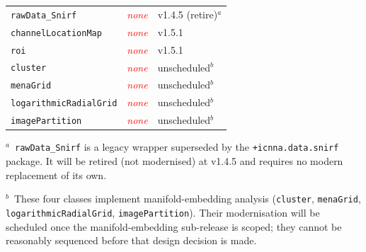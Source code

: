 \documentclass[11pt,a4paper]{article}
\newcommand{\statusNone}{\textcolor{red}{\textit{none}}}
\begin{document}
\begin{longtable}{lll}
\texttt{rawData\_Snirf}           & \statusNone & v1.4.5 (retire)$^{a}$ \\
\texttt{channelLocationMap}       & \statusNone & v1.5.1 \\
\texttt{roi}                      & \statusNone & v1.5.1 \\
\texttt{cluster}                  & \statusNone & unscheduled$^{b}$ \\
\texttt{menaGrid}                 & \statusNone & unscheduled$^{b}$ \\
\texttt{logarithmicRadialGrid}    & \statusNone & unscheduled$^{b}$ \\
\texttt{imagePartition}           & \statusNone & unscheduled$^{b}$ \\
\end{longtable}

\medskip
\noindent\small
$^{a}$~\texttt{rawData\_Snirf} is a legacy wrapper superseded by the
\texttt{+icnna.data.snirf} package. It will be retired (not modernised) at
v1.4.5 and requires no modern replacement of its own.

\smallskip
\noindent
$^{b}$~These four classes implement manifold-embedding analysis
(\texttt{cluster}, \texttt{menaGrid}, \texttt{logarithmicRadialGrid},
\texttt{imagePartition}). Their modernisation will be scheduled once the
manifold-embedding sub-release is scoped; they cannot be reasonably
sequenced before that design decision is made.
\end{document}
